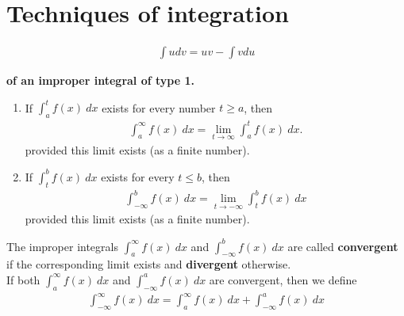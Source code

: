 \documentclass{article}
\begin{document}
\section{Techniques of integration}
\begin{theorem}
    \begin{align*}
        \int u dv = uv - \int v du
    \end{align*}
\end{theorem}
\begin{definition}
    \textbf{of an improper integral of type 1.}
    \begin{enumerate}
        \item If $\int_a^t f(x)\:dx$ exists for every number $t\geq a$, then
              \begin{align*}
                  \int_a^\infty f(x)\:dx = \lim_{t\to \infty}\int_a^t f(x)\:dx.
              \end{align*}
              provided this limit exists (as a finite number).
        \item If $\int_t^b f(x)\:dx$ exists for every $t\leq b$, then
              \begin{align*}
                  \int_{-\infty}^b f(x)\: dx = \lim_{t\to-\infty}\int_t^b f(x)\:dx
              \end{align*}
              provided this limit exists (as a finite number).
    \end{enumerate}
    The improper integrals $\int_a^\infty f(x)\:dx$ and $\int_{-\infty}^b f(x)\:dx$ are called \textbf{convergent} if the corresponding limit exists and \textbf{divergent} otherwise.\\
    If both  $\int_a^\infty f(x)\:dx$ and $\int_{-\infty}^a f(x)\:dx$ are convergent, then we define
    \begin{align*}
        \int_{-\infty}^\infty f(x)\:dx = \int_a^\infty f(x)\:dx + \int_{-\infty}^a f(x)\:dx
    \end{align*}
\end{definition}
\end{document}
